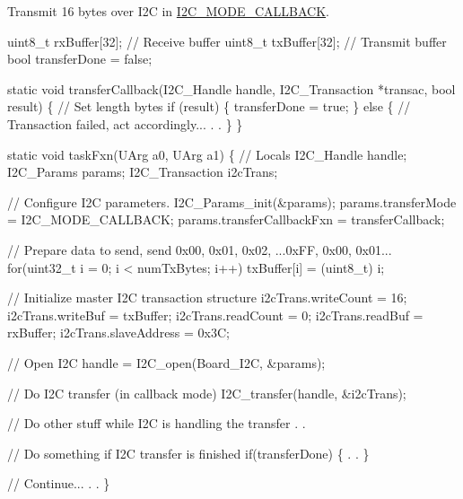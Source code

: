 Transmit 16 bytes over I2\+C in \hyperlink{_i2_c_8h_a39f3b9340fc4ee241b0d2da9b2841c26a129731a7edeb285f43a54b2cf9f5ac72}{I2\+C\+\_\+\+M\+O\+D\+E\+\_\+\+C\+A\+L\+L\+B\+A\+C\+K}. 
\begin{DoxyCode}
uint8\_t rxBuffer[32];            \textcolor{comment}{// Receive buffer}
uint8\_t txBuffer[32];            \textcolor{comment}{// Transmit buffer}
\textcolor{keywordtype}{bool} transferDone = \textcolor{keyword}{false};

\textcolor{keyword}{static} \textcolor{keywordtype}{void} transferCallback(I2C_Handle handle, I2C_Transaction *transac, \textcolor{keywordtype}{bool} result)
\{
    \textcolor{comment}{// Set length bytes}
    \textcolor{keywordflow}{if} (result) \{
        transferDone = \textcolor{keyword}{true};
    \} \textcolor{keywordflow}{else} \{
        \textcolor{comment}{// Transaction failed, act accordingly...}
        .
        .
    \}
\}

\textcolor{keyword}{static} \textcolor{keywordtype}{void} taskFxn(UArg a0, UArg a1)
\{
    \textcolor{comment}{// Locals}
    I2C_Handle handle;
    I2C_Params params;
    I2C_Transaction i2cTrans;

    \textcolor{comment}{// Configure I2C parameters.}
    I2C_Params_init(&params);
    params.transferMode = I2C_MODE_CALLBACK;
    params.transferCallbackFxn = transferCallback;

    \textcolor{comment}{// Prepare data to send, send 0x00, 0x01, 0x02, ...0xFF, 0x00, 0x01...}
    \textcolor{keywordflow}{for}(uint32\_t i = 0; i < numTxBytes; i++)
        txBuffer[i] = (uint8\_t) i;

    \textcolor{comment}{// Initialize master I2C transaction structure}
    i2cTrans.writeCount   = 16;
    i2cTrans.writeBuf     = txBuffer;
    i2cTrans.readCount    = 0;
    i2cTrans.readBuf      = rxBuffer;
    i2cTrans.slaveAddress = 0x3C;

    \textcolor{comment}{// Open I2C}
    handle = I2C_open(Board\_I2C, &params);

    \textcolor{comment}{// Do I2C transfer (in callback mode)}
    I2C_transfer(handle, &i2cTrans);

    \textcolor{comment}{// Do other stuff while I2C is handling the transfer}
    .
    .

    \textcolor{comment}{// Do something if I2C transfer is finished}
    \textcolor{keywordflow}{if}(transferDone) \{
        .
        .
    \}

    \textcolor{comment}{// Continue...}
    .
    .
\}
\end{DoxyCode}


